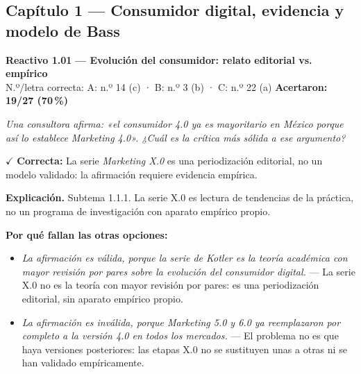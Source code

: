 \documentclass[10pt,letterpaper]{article}
\begin{document}
\subsection*{\color{guinda}Capítulo 1 — Consumidor digital, evidencia y modelo de Bass}
\begin{minipage}{\textwidth}
{\color{guinda}\textbf{Reactivo 1.01}} \textbf{— Evolución del consumidor: relato editorial vs. empírico}\\[-1pt]
{\scriptsize N.º/letra correcta: A: n.º 14 (c) · B: n.º 3 (b) · C: n.º 22 (a) \hfill \textbf{Acertaron: 19/27 (70\,\%)}}

\textit{Una consultora afirma: «el consumidor 4.0 ya es mayoritario en México porque así lo establece \textit{Marketing 4.0}». ¿Cuál es la crítica más sólida a ese argumento?}

\textcolor{verde}{$\checkmark$} \textbf{Correcta:} La serie \textit{Marketing X.0} es una periodización editorial, no un modelo validado: la afirmación requiere evidencia empírica.

\textbf{Explicación.} Subtema 1.1.1. La serie X.0 es lectura de tendencias de la práctica, no un programa de investigación con aparato empírico propio.

\textbf{Por qué fallan las otras opciones:}
\begin{itemize}[itemsep=0pt,topsep=1pt,leftmargin=1.3em,parsep=0pt]
\item[\textcolor{rojo}{$\times$}] \textit{La afirmación es válida, porque la serie de Kotler es la teoría académica con mayor revisión por pares sobre la evolución del consumidor digital.} --- La serie X.0 no es la teoría con mayor revisión por pares: es una periodización editorial, sin aparato empírico propio.
\item[\textcolor{rojo}{$\times$}] \textit{La afirmación es inválida, porque \textit{Marketing 5.0} y \textit{6.0} ya reemplazaron por completo a la versión 4.0 en todos los mercados.} --- El problema no es que haya versiones posteriores: las etapas X.0 no se sustituyen unas a otras ni se han validado empíricamente.
\end{itemize}
\end{minipage}\par\vspace{5pt}{\color{gray!40}\hrule}\vspace{5pt}
\end{document}
